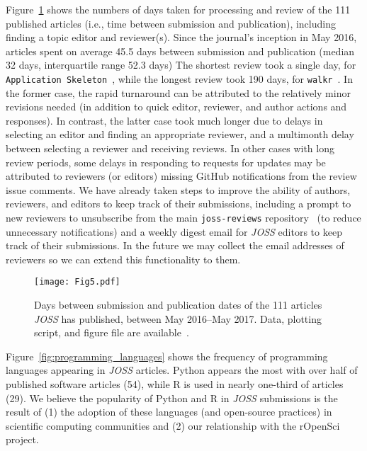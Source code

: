 \documentclass{article}
\newcommand\joss{\textit{JOSS}}
\begin{document}
Figure~\ref{fig:article_review} shows the numbers of days taken for processing
and review of the 111 published articles (i.e., time between submission
and publication), including finding a topic editor and reviewer(s). Since
the journal's inception in May 2016, articles spent on average 45.5 days
between submission and publication (median 32 days, interquartile range 52.3 days)
The shortest review took a single day, for \texttt{Application
Skeleton}~\cite{Zhang2016:joss}, while the longest review took 190 days,
for \texttt{walkr}~\cite{YuZhuYao2017:joss}. In the former case, the rapid turnaround
can be attributed to the relatively minor revisions needed (in addition to quick editor, reviewer, and author actions and
responses). In contrast, the latter case took much longer due to
delays in selecting an editor and finding an appropriate reviewer, and a
multimonth delay between selecting a reviewer and receiving reviews.
In other cases with long review periods, some delays in responding to requests
for updates may be attributed to reviewers (or editors) missing GitHub notifications
from the review issue comments.
We have already taken steps to improve the ability of authors, reviewers, and editors to keep track of their submissions, including a prompt to new reviewers to unsubscribe from the main \texttt{joss-reviews} repository~\cite{joss-reviews} (to reduce unnecessary notifications) and a weekly digest email for \joss{} editors to keep track of their submissions. In the future we may collect the email addresses of reviewers so we can extend this functionality to them.

\begin{figure}[htbp]
    \centering
    \texttt{[image: Fig5.pdf]}
    \caption{Days between submission and publication dates of the 111 articles \joss{} has published, between May 2016--May 2017.
    Data, plotting script, and figure file are available~\cite{JOSS-data-figs}.}
    \label{fig:article_review}
\end{figure}

Figure~\ref{fig:programming_languages} shows the frequency of programming languages appearing
in \joss{} articles. Python appears the most with over half of published software articles
(54), while R is used in nearly one-third of articles (29).
We believe the popularity of Python and R in \joss{} submissions is the result of (1) the adoption of these languages (and open-source practices) in scientific computing communities and (2) our relationship with the rOpenSci project.
\end{document}
